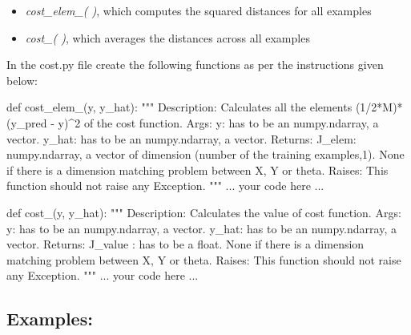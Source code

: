 \documentclass[]{article}
\newenvironment{Shaded}{\begin{snugshade}}{\end{snugshade}}
\newcommand{\CommentTok}[1]{\textcolor[rgb]{0.48,0.49,0.49}{#1}}
\newcommand{\KeywordTok}[1]{\textcolor[rgb]{0.81,0.81,0.76}{#1}}
\newcommand{\NormalTok}[1]{\textcolor[rgb]{0.81,0.81,0.76}{#1}}
\begin{document}
\begin{itemize}
\item
  \emph{cost\_elem\_( )}, which computes the squared distances for all
  examples
\item
  \emph{cost\_( )}, which averages the distances across all examples
\end{itemize}

In the cost.py file create the following functions as per the
instructions given below:

\begin{Shaded}
\begin{Highlighting}[]
\KeywordTok{def}\NormalTok{ cost_elem_(y, y_hat):}
    \CommentTok{"""}
\CommentTok{    Description:}
\CommentTok{        Calculates all the elements (1/2*M)*(y_pred - y)^2 of the cost function.}
\CommentTok{    Args:}
\CommentTok{      y: has to be an numpy.ndarray, a vector.}
\CommentTok{      y_hat: has to be an numpy.ndarray, a vector.}
\CommentTok{    Returns:}
\CommentTok{        J_elem: numpy.ndarray, a vector of dimension (number of the training examples,1).}
\CommentTok{        None if there is a dimension matching problem between X, Y or theta.}
\CommentTok{    Raises:}
\CommentTok{        This function should not raise any Exception.}
\CommentTok{    """}
\NormalTok{        ... your code here ...}

\KeywordTok{def}\NormalTok{ cost_(y, y_hat):}
    \CommentTok{"""}
\CommentTok{    Description:}
\CommentTok{        Calculates the value of cost function.}
\CommentTok{    Args:}
\CommentTok{      y: has to be an numpy.ndarray, a vector.}
\CommentTok{      y_hat: has to be an numpy.ndarray, a vector.}
\CommentTok{    Returns:}
\CommentTok{        J_value : has to be a float.}
\CommentTok{        None if there is a dimension matching problem between X, Y or theta.}
\CommentTok{    Raises:}
\CommentTok{        This function should not raise any Exception.}
\CommentTok{    """}
\NormalTok{        ... your code here ...}
\end{Highlighting}
\end{Shaded}

\hypertarget{examples-5}{%
\subsection{Examples:}\label{examples-5}}
\end{document}
